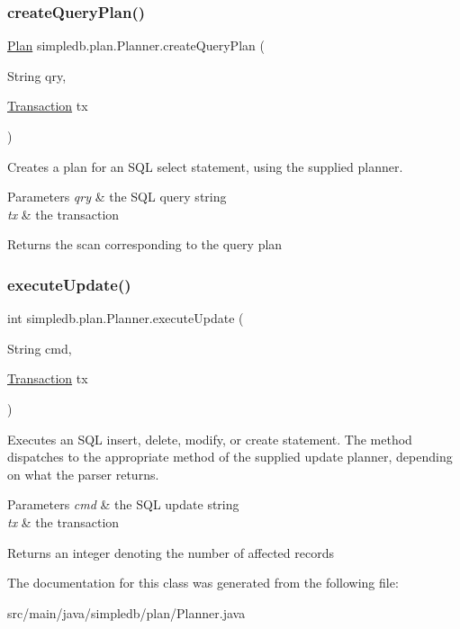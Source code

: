 \subsubsection{\texorpdfstring{create\+Query\+Plan()}{createQueryPlan()}}
{\footnotesize\ttfamily \hyperlink{interfacesimpledb_1_1plan_1_1Plan}{Plan} simpledb.\+plan.\+Planner.\+create\+Query\+Plan (\begin{DoxyParamCaption}\item[{String}]{qry,  }\item[{\hyperlink{classsimpledb_1_1tx_1_1Transaction}{Transaction}}]{tx }\end{DoxyParamCaption})\hspace{0.3cm}{\ttfamily [inline]}}

Creates a plan for an S\+QL select statement, using the supplied planner. 
\begin{DoxyParams}{Parameters}
{\em qry} & the S\+QL query string \\
\hline
{\em tx} & the transaction \\
\hline
\end{DoxyParams}
\begin{DoxyReturn}{Returns}
the scan corresponding to the query plan 
\end{DoxyReturn}
\mbox{\label{classsimpledb_1_1plan_1_1Planner_a4bf5b4eb298f5719f24a4464bf168e17}} 
\subsubsection{\texorpdfstring{execute\+Update()}{executeUpdate()}}
{\footnotesize\ttfamily int simpledb.\+plan.\+Planner.\+execute\+Update (\begin{DoxyParamCaption}\item[{String}]{cmd,  }\item[{\hyperlink{classsimpledb_1_1tx_1_1Transaction}{Transaction}}]{tx }\end{DoxyParamCaption})\hspace{0.3cm}{\ttfamily [inline]}}

Executes an S\+QL insert, delete, modify, or create statement. The method dispatches to the appropriate method of the supplied update planner, depending on what the parser returns. 
\begin{DoxyParams}{Parameters}
{\em cmd} & the S\+QL update string \\
\hline
{\em tx} & the transaction \\
\hline
\end{DoxyParams}
\begin{DoxyReturn}{Returns}
an integer denoting the number of affected records 
\end{DoxyReturn}


The documentation for this class was generated from the following file\+:\begin{DoxyCompactItemize}
\item 
src/main/java/simpledb/plan/Planner.\+java\end{DoxyCompactItemize}
